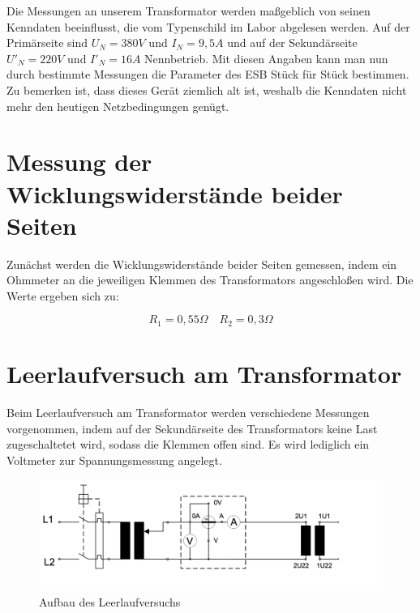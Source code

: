 \documentclass{article}
\begin{document}
\noindent
Die Messungen an unserem Transformator werden maßgeblich von seinen Kenndaten beeinflusst, die vom Typenschild im Labor abgelesen werden. Auf der Primärseite sind $U_{N} = 380V$ und $I_{N} = 9,5A$ und auf der Sekundärseite $U'_{N} = 220V$ und $I'_{N} = 16A$ Nennbetrieb. Mit diesen Angaben kann man nun durch bestimmte Messungen die Parameter des ESB Stück für Stück bestimmen.
Zu bemerken ist, dass dieses Gerät ziemlich alt ist, weshalb die Kenndaten nicht mehr den heutigen Netzbedingungen genügt.
\newpage
\section{Messung der Wicklungswiderstände beider Seiten}

Zunächst werden die Wicklungswiderstände beider Seiten gemessen, indem ein Ohmmeter an die jeweiligen Klemmen des Transformators angeschloßen wird. Die Werte ergeben sich zu:

\begin{equation*}
  \label{eq:1}
  R_{1} = 0,55\Omega \quad R_{2} = 0,3\Omega
\end{equation*}

\section{Leerlaufversuch am Transformator}

Beim Leerlaufversuch am Transformator werden verschiedene Messungen vorgenommen, indem auf der Sekundärseite des Transformators keine Last zugeschaltetet wird, sodass die Klemmen offen sind. Es wird lediglich ein Voltmeter zur Spannungsmessung angelegt.

\begin{figure}[h]
  \centering
  \includegraphics[width=\textwidth]{../assets/images/gep3/leerlauf_aufbau.png}
  \caption{Aufbau des Leerlaufversuchs}
  \label{fig:leerlaufaufbau}
\end{figure}
\end{document}
